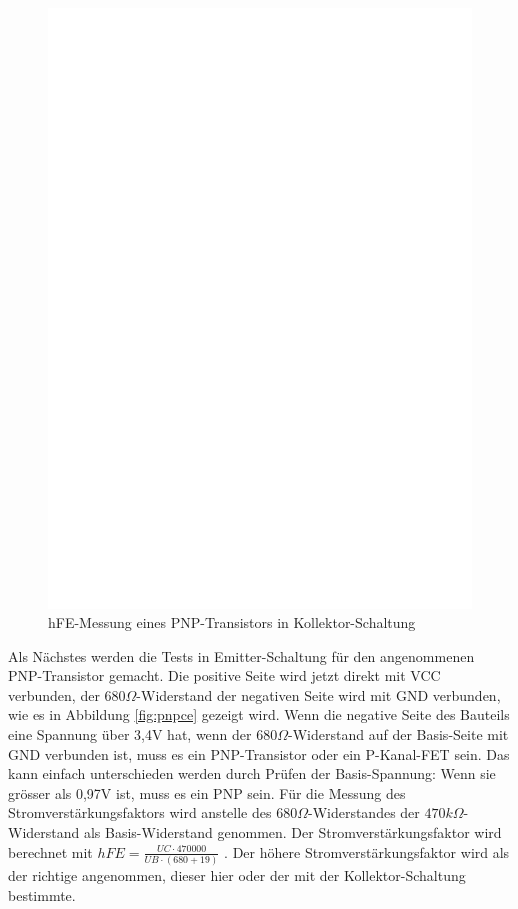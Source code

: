 \begin{figure}[H]
\centering
\includegraphics[]{../FIG/PNPcc.eps}
\caption{hFE-Messung eines PNP-Transistors in Kollektor-Schaltung}
\label{fig:pnpcc}
\end{figure}

Als Nächstes werden die Tests in Emitter-Schaltung für den angenommenen PNP-Transistor gemacht.
Die positive Seite wird jetzt direkt mit VCC verbunden, der \(680\Omega\)-Widerstand der negativen Seite wird 
mit GND verbunden, wie es in Abbildung \ref{fig:pnpce} gezeigt wird. 
Wenn die negative Seite des Bauteils eine Spannung über 3,4V hat, wenn der \(680\Omega\)-Widerstand auf der Basis-Seite mit
GND verbunden ist, muss es ein PNP-Transistor oder ein P-Kanal-FET sein.
Das kann einfach unterschieden werden durch Prüfen der Basis-Spannung: Wenn sie grösser als 0,97V ist, muss es ein PNP sein.
Für die Messung des Stromverstärkungsfaktors wird anstelle des \(680\Omega\)-Widerstandes der
 \(470k\Omega\)-Widerstand als Basis-Widerstand genommen.
Der Stromverstärkungsfaktor wird berechnet mit \(hFE = \frac{UC \cdot 470000}{UB \cdot (680+19)}\) .
Der höhere Stromverstärkungsfaktor wird als der richtige angenommen, dieser hier oder der
mit der Kollektor-Schaltung bestimmte.

